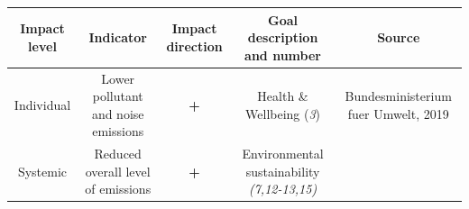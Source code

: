 \documentclass[
]{book}
\begin{document}
\begin{longtable}[]{@{}ccccc@{}}
\toprule
\begin{minipage}[b]{0.17\columnwidth}\centering
Impact level\strut
\end{minipage} & \begin{minipage}[b]{0.16\columnwidth}\centering
Indicator\strut
\end{minipage} & \begin{minipage}[b]{0.17\columnwidth}\centering
Impact direction\strut
\end{minipage} & \begin{minipage}[b]{0.17\columnwidth}\centering
Goal description and number\strut
\end{minipage} & \begin{minipage}[b]{0.17\columnwidth}\centering
Source\strut
\end{minipage}\tabularnewline
\midrule
\endhead
\begin{minipage}[t]{0.17\columnwidth}\centering
Individual\strut
\end{minipage} & \begin{minipage}[t]{0.16\columnwidth}\centering
Lower pollutant and noise emissions\strut
\end{minipage} & \begin{minipage}[t]{0.17\columnwidth}\centering
\textbf{+}\strut
\end{minipage} & \begin{minipage}[t]{0.17\columnwidth}\centering
Health \& Wellbeing (\emph{3})\strut
\end{minipage} & \begin{minipage}[t]{0.17\columnwidth}\centering
Bundesministerium fuer Umwelt, 2019\strut
\end{minipage}\tabularnewline
\begin{minipage}[t]{0.17\columnwidth}\centering
Systemic\strut
\end{minipage} & \begin{minipage}[t]{0.16\columnwidth}\centering
Reduced overall level of emissions\strut
\end{minipage} & \begin{minipage}[t]{0.17\columnwidth}\centering
\textbf{+}\strut
\end{minipage} & \begin{minipage}[t]{0.17\columnwidth}\centering
Environmental sustainability \emph{(7,12-13,15)}\strut
\end{minipage} & \begin{minipage}[t]{0.17\columnwidth}\centering

\end{minipage}
\end{longtable}
\end{document}
